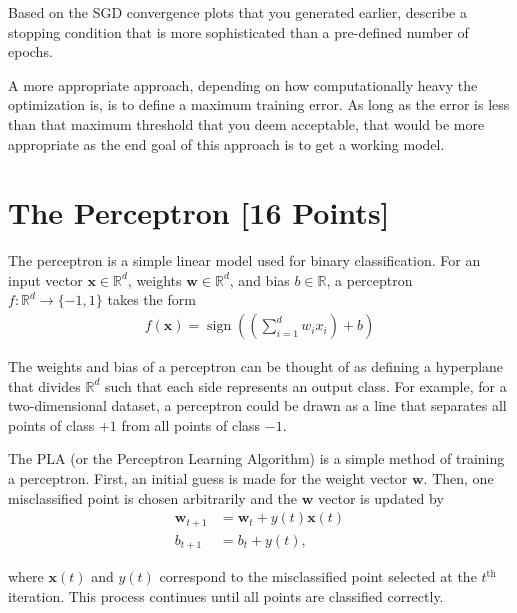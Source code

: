 \begin{problem}[2]
  Based on the SGD convergence plots that you generated earlier, describe a stopping condition that is more sophisticated than a pre-defined number of epochs.
\end{problem}
\begin{solution}
  A more appropriate approach, depending on how computationally heavy the optimization is, is to define a maximum training error. As long as the error is less than that maximum threshold that you deem acceptable, that would be more appropriate as the end goal of this approach is to get a working model.
\end{solution}



\newpage
\section{The Perceptron [16 Points]}

The perceptron is a simple linear model used for binary classification. For an input vector $\mathbf{x} \in \mathbb{R}^d$, weights $\mathbf{w} \in \mathbb{R}^d$, and bias $b \in \mathbb{R}$, a perceptron $f: \mathbb{R}^d \rightarrow \{-1,1\}$ takes the form
\begin{align*}
  f(\mathbf{x}) = \operatorname{sign}\left(\left(\sum_{i=1}^d w_i x_i\right) + b \right)
\end{align*}

The weights and bias of a perceptron can be thought of as defining a hyperplane that divides $\mathbb{R}^d$ such that each side represents an output class. For example, for a two-dimensional dataset, a perceptron could be drawn as a line that separates all points of class $+1$ from all points of class $-1$.

The PLA (or the Perceptron Learning Algorithm) is a simple method of training a perceptron. First, an initial guess is made for the weight vector $\mathbf{w}$. Then, one misclassified point is chosen arbitrarily and the $\mathbf{w}$ vector is updated by
\begin{align*}
  \mathbf{w}_{t+1} &= \mathbf{w}_t + y(t)\mathbf{x}(t) \\
  b_{t + 1} &= b_t + y(t),
\end{align*}

where $\mathbf{x}(t)$ and $y(t)$ correspond to the misclassified point selected at the $t^\text{th}$ iteration.
This process continues until all points are classified correctly.

